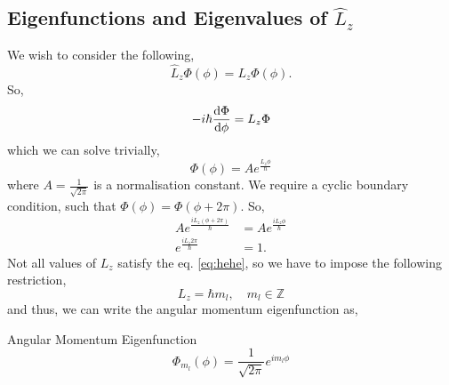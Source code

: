 \documentclass{book}
\begin{document}
\subsection{Eigenfunctions and Eigenvalues of $\hat{L}_z$}
We wish to consider the following,
\begin{equation}
	\hat{L}_z \Phi(\phi) = L_z\Phi(\phi).
\end{equation}
So,
\begin{equation}
	-i\hbar\dv{\Phi}{\phi} = L_z \Phi\label{eq:24}
\end{equation}
which we can solve trivially,
\begin{equation}
	\Phi(\phi) = Ae^{\frac{L_z\phi}{\hbar}} \label{eq:khf}
\end{equation}
where $A = \frac{1}{\sqrt{2\pi}}$ is a normalisation constant. We require a cyclic boundary condition, such that $\Phi(\phi) = \Phi(\phi + 2\pi)$. So,
\begin{equation}
	\begin{split}
	Ae^{\frac{iL_z(\phi + 2\pi)}{\hbar}} & = A e^{\frac{iL_z\phi}{\hbar}} \\
	e^{\frac{iL_z2\pi}{\hbar}} & = 1.
\end{split} \label{eq:hehe}
\end{equation}
Not all values of $L_z$ satisfy the eq. \eqref{eq:hehe}, so we have to impose the following restriction,
\begin{equation}
	L_z = \hbar m_l, \hspace{1em} m_l \in \mathbb{Z}
\end{equation}
and thus, we can write the angular momentum eigenfunction as,
\begin{Definitions}{Angular Momentum Eigenfunction}{}
	\begin{equation}
		\Phi_{m_l}(\phi) = \frac{1}{\sqrt{2\pi}} e^{im_l\phi}
	\end{equation}
\end{Definitions}
\end{document}
